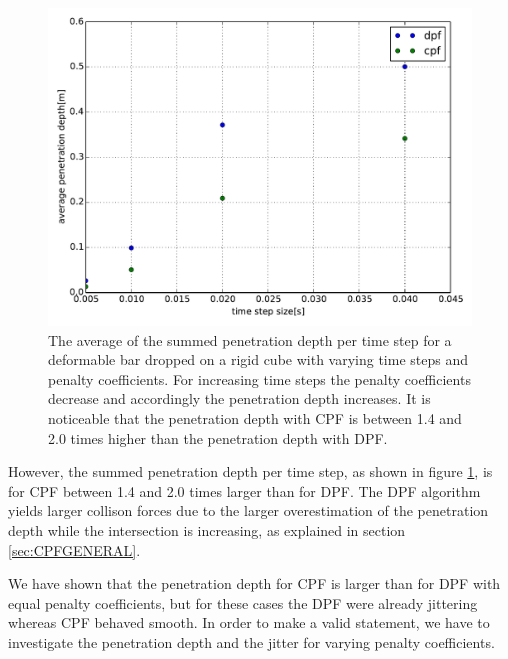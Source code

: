 \begin{figure}[h] 
		\centering
			       \includegraphics[width=0.5\linewidth]{pics/pdf/defBar_vs_RigCubeBM_depth.pdf} 

  \caption[The average of the summed penetration depth per time step for a deformable bar dropped on a rigid cube with varying time steps an penalty coefficients.]{The average of the summed penetration depth per time step for a deformable bar dropped on a rigid cube with varying time steps and penalty coefficients. For increasing time steps the penalty coefficients decrease and accordingly the penetration depth increases. It is noticeable that the penetration depth with CPF is between 1.4 and 2.0 times higher than the penetration depth with DPF.}
  \label{fig::defBar_vs_RigCubeBM_depth}
\end{figure}
However, the summed penetration depth per time step, as shown in figure \ref{fig::defBar_vs_RigCubeBM_depth}, is for CPF  between 1.4 and 2.0 times larger than for DPF. The DPF algorithm yields larger collison forces due to the larger overestimation of the penetration depth while the intersection is increasing, as explained in section \ref{sec:CPFGENERAL}.

We have shown that the penetration depth for CPF is larger than for DPF with equal penalty coefficients, but for these cases the DPF were already jittering whereas CPF behaved smooth. In order to make a valid statement, we have to investigate the penetration depth and the jitter for varying penalty coefficients.


